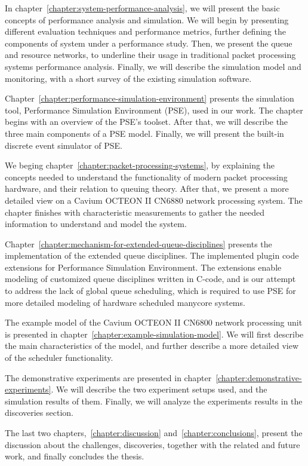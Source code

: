
In chapter~\ref{chapter:system-performance-analysis}, we will present the basic concepts of performance analysis and simulation. We will begin by presenting different evaluation techniques and performance metrics, further defining the components of system under a performance study. Then, we present the queue and resource networks, to underline their usage in traditional packet processing systems performance analysis. Finally, we will describe the simulation model and monitoring, with a short survey of the existing simulation software.

Chapter~\ref{chapter:performance-simulation-environment} presents the simulation tool, Performance Simulation Environment (PSE), used in our work. The chapter begins with an overview of the PSE's toolset. After that, we will describe the three main components of a PSE model. Finally, we will present the built-in discrete event simulator of PSE.

We beging chapter~\ref{chapter:packet-processing-systems}, by explaining the concepts needed to understand the functionality of modern packet processing hardware, and their relation to queuing theory. After that, we present a more detailed view on a Cavium OCTEON II CN6880 network processing system. The chapter finishes with characteristic measurements to gather the needed information to understand and model the system.

Chapter~\ref{chapter:mechanism-for-extended-queue-disciplines} presents the implementation of the extended queue disciplines. The implemented plugin code extensions for Performance Simulation Environment. The extensions enable modeling of customized queue disciplines written in C-code, and is our attempt to address the lack of global queue scheduling, which is required to use PSE for more detailed modeling of  hardware scheduled manycore systems.

The example model of the Cavium OCTEON II CN6800 network processing unit is presented in chapter~\ref{chapter:example-simulation-model}. We will first describe the main characteristics of the model, and further describe a more detailed view of the scheduler functionality.

The demonstrative experiments are presented in chapter~\ref{chapter:demonstrative-experiments}. We will describe the two experiment setups used, and the simulation results of them. Finally, we will analyze the experiments results in the discoveries section.

The last two chapters,~\ref{chapter:discussion} and~\ref{chapter:conclusions}, present the discussion about the challenges, discoveries, together with the related and future work, and finally concludes the thesis.

